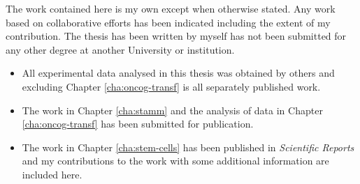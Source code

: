 \documentclass[11pt,a4paper]{report}      %
\begin{document}

\thesiscopyrightpage                 %

 \thesistitlepage                     %


\tableofcontents                     %

\begin{thesisacknowledgments}        %


\end{thesisacknowledgments}

\begin{thesisdeclaration}        %

  The work contained here is my own except when otherwise stated. Any work based on collaborative efforts has been indicated including the extent of my contribution. The thesis has been written by myself has not been submitted for any other degree at another University or institution.

  \begin{itemize}
  \item All experimental data analysed in this thesis was obtained by others and excluding Chapter \ref{cha:oncog-transf} is all separately published work.
  \item The work in Chapter \ref{cha:stamm} and the analysis of data in Chapter \ref{cha:oncog-transf} has been submitted for publication.
  \item The work in Chapter \ref{cha:stem-cells} has been published in \emph{Scientific Reports} and my contributions to the work with some additional information are included here.
  \end{itemize}

\end{thesisdeclaration}
\end{document}

